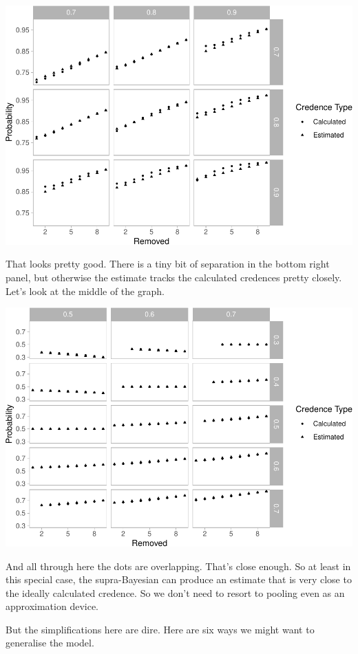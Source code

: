 \documentclass[
  12pt,
]{article}
\begin{document}
\includegraphics{mixing-experts-not-anon_files/figure-latex/unnamed-chunk-5-1.pdf}

That looks pretty good. There is a tiny bit of separation in the bottom
right panel, but otherwise the estimate tracks the calculated credences
pretty closely. Let's look at the middle of the graph.

\includegraphics{mixing-experts-not-anon_files/figure-latex/unnamed-chunk-6-1.pdf}

And all through here the dots are overlapping. That's close enough. So
at least in this special case, the supra-Bayesian can produce an
estimate that is very close to the ideally calculated credence. So we
don't need to resort to pooling even as an approximation device.

But the simplifications here are dire. Here are six ways we might want
to generalise the model.
\end{document}

